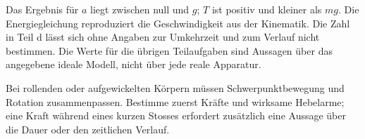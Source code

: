 \begin{kontrolle}
Das Ergebnis für $a$ liegt zwischen null und $g$; $T$ ist positiv und kleiner
als $mg$. Die Energiegleichung reproduziert die Geschwindigkeit aus der
Kinematik. Die Zahl in Teil d lässt sich ohne Angaben zur Umkehrzeit und zum
Verlauf nicht bestimmen. Die Werte für die übrigen Teilaufgaben sind Aussagen
über das angegebene ideale Modell, nicht über jede reale Apparatur.
\end{kontrolle}

\begin{merksatz}
Bei rollenden oder aufgewickelten Körpern müssen Schwerpunktbewegung und
Rotation zusammenpassen. Bestimme zuerst Kräfte und wirksame Hebelarme; eine
Kraft während eines kurzen Stosses erfordert zusätzlich eine Aussage über die
Dauer oder den zeitlichen Verlauf.
\end{merksatz}
